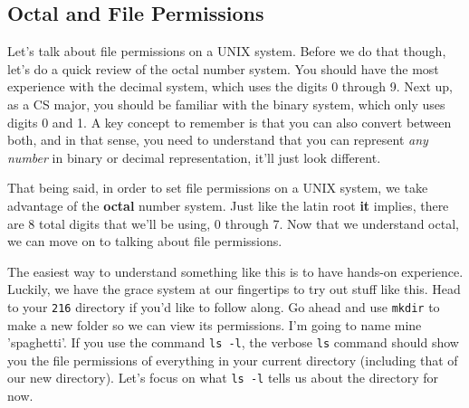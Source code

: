 \documentclass[english, 10pt]{article}
\begin{document}
\subsection{Octal and File Permissions}

Let's talk about file permissions on a UNIX system. Before we do that though, let's do a quick review of the octal number system. You should have the most experience with the decimal system, which uses the digits 0 through 9. Next up, as a CS major, you should be familiar with the binary system, which only uses digits 0 and 1. A key concept to remember is that you can also convert between both, and in that sense, you need to understand that you can represent \textit{any number} in binary or decimal representation, it'll just look different.\newline

That being said, in order to set file permissions on a UNIX system, we take advantage of the \textbf{octal} number system. Just like the latin root \textbf{it} implies, there are 8 total digits that we'll be using, 0 through 7. Now that we understand octal, we can move on to talking about file permissions.\newline

The easiest way to understand something like this is to have hands-on experience. Luckily, we have the grace system at our fingertips to try out stuff like this. Head to your \texttt{216} directory if you'd like to follow along. Go ahead and use \texttt{mkdir} to make a new folder so we can view its permissions. I'm going to name mine 'spaghetti'. If you use the command \texttt{ls -l}, the verbose \texttt{ls} command should show you the file permissions of everything in your current directory (including that of our new directory). Let's focus on what \texttt{ls -l} tells us about the directory for now.\newline
\end{document}
